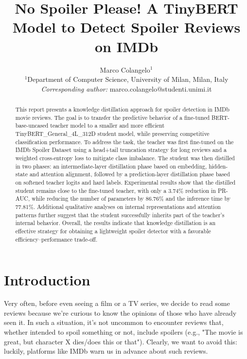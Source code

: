 \documentclass[11pt, a4paper]{article}
\begin{document}
\title{\textbf{No Spoiler Please! A TinyBERT Model to Detect Spoiler Reviews on IMDb}}

\author{
    Marco Colangelo$^1$ \\
    \normalsize $^1$Department of Computer Science, University of Milan, Milan, Italy \\
    \normalsize \textit{Corresponding author:} marco.colangelo@studenti.unimi.it
}

\date{} %

\maketitle

\begin{abstract}
This report presents a knowledge distillation approach for spoiler detection in IMDb movie reviews. The goal is to transfer the predictive behavior of a fine-tuned BERT-base-uncased teacher model to a smaller and more efficient TinyBERT\_General\_4L\_312D student model, while preserving competitive classification performance. To address the task, the teacher was first fine-tuned on the IMDb Spoiler Dataset using a head+tail truncation strategy for long reviews and a weighted cross-entropy loss to mitigate class imbalance. The student was then distilled in two phases: an intermediate-layer distillation phase based on embedding, hidden-state and attention alignment, followed by a prediction-layer distillation phase based on softened teacher logits and hard labels. Experimental results show that the distilled student remains close to the fine-tuned teacher, with only a 3.74\% reduction in PR-AUC, while reducing the number of parameters by 86.76\% and the inference time by 77.81\%. Additional qualitative analyses on internal representations and attention patterns further suggest that the student successfully inherits part of the teacher's internal behavior. Overall, the results indicate that knowledge distillation is an effective strategy for obtaining a lightweight spoiler detector with a favorable efficiency--performance trade-off.
\end{abstract}



\section{Introduction}
Very often, before even seeing a film or a TV series, we decide to read some reviews because we're curious to know the opinions of those who have already seen it. In such a situation, it's not uncommon to encounter reviews that, whether intended to spoil something or not, include spoilers (e.g., "The movie is great, but character X dies/does this or that"). Clearly, we want to avoid this: luckily, platforms like IMDb warn us in advance about such reviews.
\end{document}
